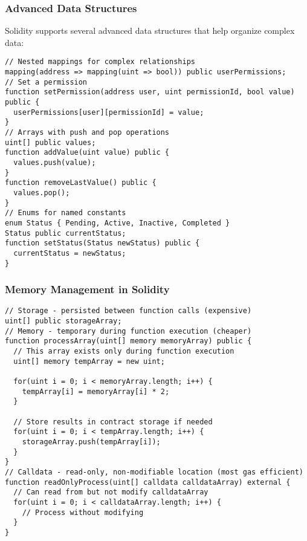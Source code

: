 \documentclass[12pt]{article}
\begin{document}
\noindent
\begin{minipage}[c]{\textwidth}
\subsubsection*{Advanced Data Structures}

Solidity supports several advanced data structures that help organize complex data:

\begin{lstlisting}[language=Solidity]
// Nested mappings for complex relationships
mapping(address => mapping(uint => bool)) public userPermissions;
// Set a permission
function setPermission(address user, uint permissionId, bool value) public {
  userPermissions[user][permissionId] = value;
}
// Arrays with push and pop operations
uint[] public values;
function addValue(uint value) public {
  values.push(value);
}
function removeLastValue() public {
  values.pop();
}
// Enums for named constants
enum Status { Pending, Active, Inactive, Completed }
Status public currentStatus;
function setStatus(Status newStatus) public {
  currentStatus = newStatus;
}
\end{lstlisting}

\subsubsection*{Memory Management in Solidity}


\begin{lstlisting}[language=Solidity]
// Storage - persisted between function calls (expensive)
uint[] public storageArray;
// Memory - temporary during function execution (cheaper)
function processArray(uint[] memory memoryArray) public {
  // This array exists only during function execution
  uint[] memory tempArray = new uint;
  
  for(uint i = 0; i < memoryArray.length; i++) {
    tempArray[i] = memoryArray[i] * 2;
  }

  // Store results in contract storage if needed
  for(uint i = 0; i < tempArray.length; i++) {
    storageArray.push(tempArray[i]);
  }
}
// Calldata - read-only, non-modifiable location (most gas efficient)
function readOnlyProcess(uint[] calldata calldataArray) external {
  // Can read from but not modify calldataArray
  for(uint i = 0; i < calldataArray.length; i++) {
    // Process without modifying
  }
}
\end{lstlisting}
\end{minipage}
\end{document}
